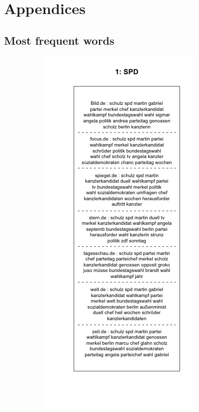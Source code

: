 \documentclass[12pt,a4paper,notitlepage]{article}
\begin{document}
\section{Appendices}

\subsection{Most frequent words}\label{apx_tf}
\begin{figure}[H]
	\begin{center}
		\begin{subfigure}[normla]{0.49\textwidth}
			\includegraphics[width=\textwidth]{../figs/plotquote1.png}

\end{subfigure}
\end{center}
\end{figure}
\end{document}
